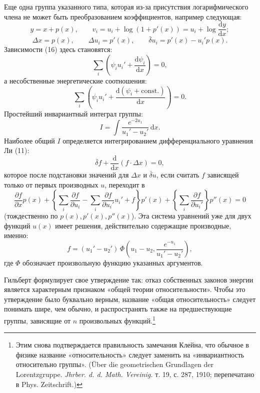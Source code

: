 \documentclass[11pt]{article}
\providecommand{\D}{\Delta}
\providecommand{\p}{\partial}
\providecommand{\dd}{\mathrm d}
\providecommand{\bd}{\bar{\delta}}
\providecommand{\lg}{\log}
\begin{document}
Еще одна группа указанного типа, которая из-за присутствия логарифмического члена не может быть преобразованием коэффициентов, например следующая:
\[
y=x+p(x),\qquad
v_i=u_i+\lg(1+p'(x))=u_i+\lg\frac{\dd y}{\dd x};
\]
\[
\D x=p(x),\qquad
\D u_i=p'(x),\qquad
\bd u_i=p'(x)-u_i'p(x).
\]
Зависимости (16) здесь становятся:
\[
\sum_i\left(\psi_i u_i'+\frac{\dd\psi_i}{\dd x}\right)=0,
\]
а несобственные энергетические соотношения:
\[
\sum_i\left(\psi_i u_i'+
\frac{\dd(\psi_i+\mathrm{const.})}{\dd x}\right)=0.
\]
Простейший инвариантный интеграл группы:
\[
I=\int \frac{e^{-2u_1}}{u_1'-u_2'}\,\dd x.
\]
Наиболее общий \(I\) определяется интегрированием дифференциального уравнения Ли (11):
\[
\bd f+\frac{\dd}{\dd x}(f\cdot \D x)=0,
\]
которое после подстановки значений для \(\D x\) и \(\bd u\), если считать \(f\) зависящей только от первых производных \(u\), переходит в
\[
\frac{\p f}{\p x}p(x)
+\left\{\sum_i\frac{\p f}{\p u_i}
-\sum_i\frac{\p f}{\p u_i'}u_i'+f\right\}p'(x)
+\left\{\sum_i\frac{\p f}{\p u_i'}\right\}p''(x)=0
\]
(тождественно по \(p(x),p'(x),p''(x)\)). Эта система уравнений уже для двух функций \(u(x)\) имеет решения, действительно содержащие производные, именно:
\[
f=(u_1'-u_2')\,
\Phi\!\left(u_1-u_2,\frac{e^{-u_1}}{u_1'-u_2'}\right),
\]
где \(\Phi\) обозначает произвольную функцию указанных аргументов.

Гильберт формулирует свое утверждение так: отказ собственных законов энергии является характерным признаком «общей теории относительности». Чтобы это утверждение было буквально верным, название «общая относительность» следует понимать шире, чем обычно, и распространять также на предшествующие группы, зависящие от \(n\) произвольных функций.\footnote{Этим снова подтверждается правильность замечания Клейна, что обычное в физике название «относительность» следует заменить на «инвариантность относительно группы». (Über die geometrischen Grundlagen der Lorentzgruppe. \emph{Jhrber. d. d. Math. Vereinig.} т. 19, с. 287, 1910; перепечатано в Phys. Zeitschrift.)}
\end{document}
